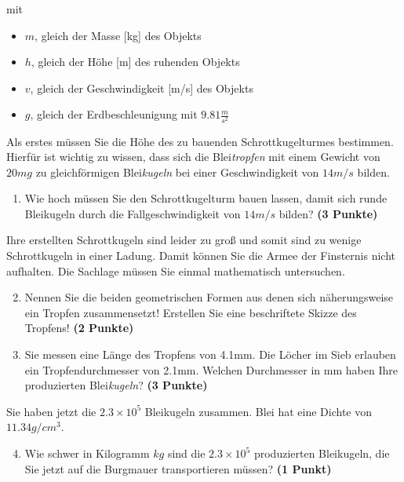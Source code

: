 \documentclass[a4paper, 9pt]{scrartcl}\usepackage[]{graphicx}\usepackage[]{xcolor}
\begin{document}
mit

\begin{itemize}[noitemsep]
\item $m$, gleich der Masse [kg] des Objekts
\item $h$, gleich der Höhe [m] des ruhenden Objekts
\item $v$, gleich der Geschwindigkeit [m/s] des Objekts
\item $g$, gleich der Erdbeschleunigung mit $9.81 \tfrac{m}{s^2}$ 
\end{itemize}

Als erstes müssen Sie die Höhe des zu bauenden Schrottkugelturmes bestimmen. Hierfür ist wichtig zu wissen, dass sich die Blei\textit{tropfen} mit einem Gewicht von $20mg$ zu gleichförmigen Blei\textit{kugeln} bei einer Geschwindigkeit von $14m/s$ bilden.

\begin{enumerate}
\item Wie hoch müssen Sie den Schrottkugelturm bauen lassen, damit sich runde Bleikugeln durch die Fallgeschwindigkeit von $14m/s$ bilden? \textbf{(3 Punkte)}
\end{enumerate}

Ihre erstellten Schrottkugeln sind leider zu gro{\ss} und somit sind zu wenige Schrottkugeln in einer Ladung. Damit können Sie die Armee der Finsternis nicht aufhalten. Die Sachlage müssen Sie einmal mathematisch untersuchen.

\begin{enumerate}
  \setcounter{enumi}{1}
\item Nennen Sie die beiden geometrischen Formen aus denen sich näherungsweise ein Tropfen zusammensetzt! Erstellen Sie eine beschriftete Skizze des Tropfens! \textbf{(2 Punkte)}
\item Sie messen eine Länge des Tropfens von 4.1mm. Die Löcher im Sieb erlauben ein Tropfendurchmesser von 2.1mm. Welchen Durchmesser in mm haben Ihre produzierten Blei\textit{kugeln}?  \textbf{(3 Punkte)}
\end{enumerate}

Sie haben jetzt die \ensuremath{2.3\times 10^{5}} Bleikugeln zusammen. Blei hat eine Dichte
von $11.34g/cm^3$.

\begin{enumerate}
  \setcounter{enumi}{3}
\item Wie schwer in Kilogramm $kg$ sind die \ensuremath{2.3\times 10^{5}} produzierten
  Bleikugeln, die Sie jetzt auf die Burgmauer transportieren müssen?
  \textbf{(1 Punkt)}
\end{enumerate}
\end{document}
